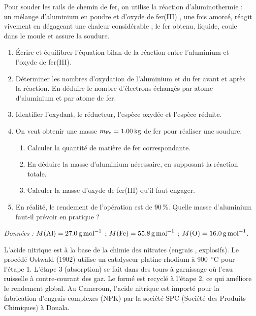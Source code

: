\documentclass[11pt]{article}
\begin{document}
\begin{exercice}
Pour souder les rails de chemin de fer, on utilise la réaction d'aluminothermie : un mélange d'aluminium en poudre et d'oxyde de fer(III) , une fois amorcé, réagit vivement en dégageant une chaleur considérable ; le fer obtenu, liquide, coule dans le moule et assure la soudure.
\begin{enumerate}
\item Écrire et équilibrer l'équation-bilan de la réaction entre l'aluminium et l'oxyde de fer(III).
\item Déterminer les nombres d'oxydation de l'aluminium et du fer avant et après la réaction. En déduire le nombre d'électrons échangés par atome d'aluminium et par atome de fer.
\item Identifier l'oxydant, le réducteur, l'espèce oxydée et l'espèce réduite.
\item On veut obtenir une masse $m_{\ce{Fe}} = \SI{1,00}{kg}$ de fer pour réaliser une soudure.
\begin{enumerate}
\item Calculer la quantité de matière de fer correspondante.
\item En déduire la masse d'aluminium nécessaire, en supposant la réaction totale.
\item Calculer la masse d'oxyde de fer(III) qu'il faut engager.
\end{enumerate}
\item En réalité, le rendement de l'opération est de $90\,\%$. Quelle masse d'aluminium faut-il prévoir en pratique ?
\end{enumerate}
\emph{Données :} $M(\ce{Al}) = \SI{27,0}{g.mol^{-1}}$ ; $M(\ce{Fe}) = \SI{55,8}{g.mol^{-1}}$ ; $M(\ce{O}) = \SI{16,0}{g.mol^{-1}}$.
\end{exercice}

\begin{savaistu}
L'acide nitrique est à la base de la chimie des nitrates (engrais , explosifs). Le procédé Ostwald (1902) utilise un catalyseur platine-rhodium à \SI{900}{\celsius} pour l'étape 1. L'étape 3 (absorption) se fait dans des tours à garnissage où l'eau ruisselle à contre-courant des gaz. Le  formé est recyclé à l'étape 2, ce qui améliore le rendement global. Au Cameroun, l'acide nitrique est importé pour la fabrication d'engrais complexes (NPK) par la société SPC (Société des Produits Chimiques) à Douala.
\end{savaistu}
\end{document}
